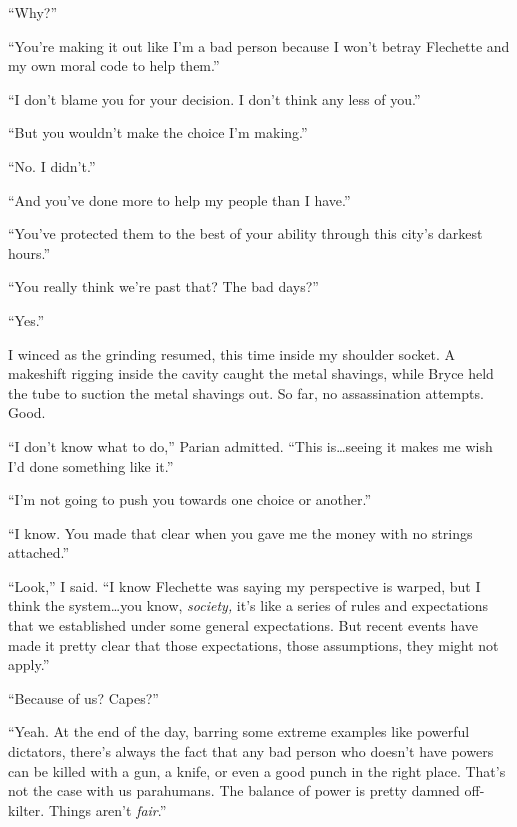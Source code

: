 ``Why?''



``You're making it out like I'm a bad person because I won't betray Flechette and my own moral code to help them.''



``I don't blame you for your decision.  I don't think any less of you.''



``But you wouldn't make the choice I'm making.''



``No.  I didn't.''



``And you've done more to help my people than I have.''



``You've protected them to the best of your ability through this city's darkest hours.''



``You really think we're past that?  The bad days?''



``Yes.''



I winced as the grinding resumed, this time inside my shoulder socket.  A makeshift rigging inside the cavity caught the metal shavings, while Bryce held the tube to suction the metal shavings out.  So far, no assassination attempts.  Good.



``I don't know what to do,'' Parian admitted.  ``This is\ldots seeing it makes me wish I'd done something like it.''



``I'm not going to push you towards one choice or another.''



``I know.  You made that clear when you gave me the money with no strings attached.''



``Look,'' I said.  ``I know Flechette was saying my perspective is warped, but I think the system\ldots you know, \emph{society, }it's like a series of rules and expectations that we established under some general expectations.  But recent events have made it pretty clear that those expectations, those assumptions, they might not apply.''



``Because of us?  Capes?''



``Yeah.  At the end of the day, barring some extreme examples like powerful dictators, there's always the fact that any bad person who doesn't have powers can be killed with a gun, a knife, or even a good punch in the right place.  That's not the case with us parahumans.  The balance of power is pretty damned off-kilter.  Things aren't \emph{fair}.''



